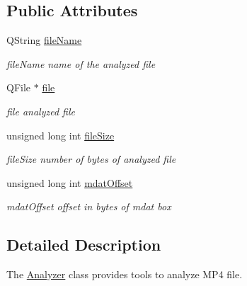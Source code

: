 \subsection*{Public Attributes}
\begin{DoxyCompactItemize}
\item 
\hypertarget{class_analyzer_a73d4ffb680459092c5797f515a693cde}{Q\-String \hyperlink{class_analyzer_a73d4ffb680459092c5797f515a693cde}{file\-Name}}\label{class_analyzer_a73d4ffb680459092c5797f515a693cde}

\begin{DoxyCompactList}\small\item\em file\-Name name of the analyzed file \end{DoxyCompactList}\item 
\hypertarget{class_analyzer_a4280ce2f8f0cda359f99c7716a00fe1f}{Q\-File $\ast$ \hyperlink{class_analyzer_a4280ce2f8f0cda359f99c7716a00fe1f}{file}}\label{class_analyzer_a4280ce2f8f0cda359f99c7716a00fe1f}

\begin{DoxyCompactList}\small\item\em file analyzed file \end{DoxyCompactList}\item 
\hypertarget{class_analyzer_a0d97ef51dc86ac0a71c374abc9a6f19f}{unsigned long int \hyperlink{class_analyzer_a0d97ef51dc86ac0a71c374abc9a6f19f}{file\-Size}}\label{class_analyzer_a0d97ef51dc86ac0a71c374abc9a6f19f}

\begin{DoxyCompactList}\small\item\em file\-Size number of bytes of analyzed file \end{DoxyCompactList}\item 
\hypertarget{class_analyzer_a9d192cb65cf7481553f4056b6b7e7968}{unsigned long int \hyperlink{class_analyzer_a9d192cb65cf7481553f4056b6b7e7968}{mdat\-Offset}}\label{class_analyzer_a9d192cb65cf7481553f4056b6b7e7968}

\begin{DoxyCompactList}\small\item\em mdat\-Offset offset in bytes of mdat box \end{DoxyCompactList}\end{DoxyCompactItemize}


\subsection{Detailed Description}
The \hyperlink{class_analyzer}{Analyzer} class provides tools to analyze M\-P4 file. 

